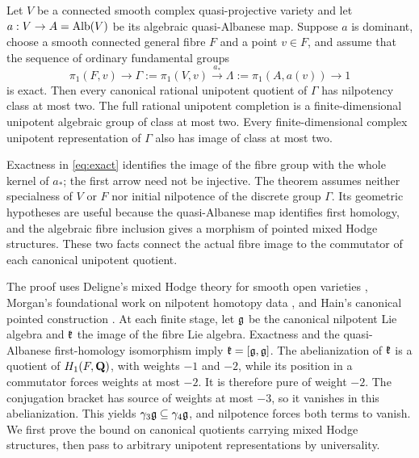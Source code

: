 \begin{theorem}\label{thm:completion}
Let $V$ be a connected smooth complex quasi-projective variety and let
$a:V\to A=\operatorname{Alb}(V)$ be its algebraic quasi-Albanese map. Suppose $a$ is
dominant, choose a smooth connected general fibre $F$ and a point
$v\in F$, and assume that the sequence of ordinary fundamental groups
\begin{equation}\label{eq:exact}
 \pi_1(F,v)\longrightarrow\Gamma:=\pi_1(V,v)
 \xrightarrow{a_*}\Lambda:=\pi_1(A,a(v))\longrightarrow1
\end{equation}
is exact. Then every canonical rational unipotent quotient of $\Gamma$
has nilpotency class at most two. The full rational unipotent completion
is a finite-dimensional unipotent algebraic group of class at most two.
Every finite-dimensional complex unipotent representation of $\Gamma$
also has image of class at most two.
\end{theorem}

Exactness in \eqref{eq:exact} identifies the image of the fibre group
with the whole kernel of $a_*$; the first arrow need not be injective.
The theorem assumes neither specialness of $V$ or $F$ nor initial
nilpotence of the discrete group $\Gamma$. Its geometric hypotheses
are useful because the quasi-Albanese map identifies first homology,
and the algebraic fibre inclusion gives a morphism of pointed mixed
Hodge structures. These two facts connect the actual fibre image to
the commutator of each canonical unipotent quotient.

The proof uses Deligne's mixed Hodge theory for smooth open varieties
\cite{Deligne1971}, Morgan's foundational work on nilpotent homotopy data
\cite{Morgan1978,Morgan1986}, and Hain's canonical pointed construction
\cite{Hain1987}. At each finite stage, let $\mathfrak g$ be the canonical
nilpotent Lie algebra and $\mathfrak k$ the image of the fibre Lie algebra.
Exactness and the quasi-Albanese first-homology isomorphism imply
$\mathfrak k=[\mathfrak g,\mathfrak g]$. The abelianization of $\mathfrak k$ is a quotient of
$H_1(F,\mathbf Q)$, with weights $-1$ and $-2$, while its position in a
commutator forces weights at most $-2$. It is therefore pure of weight
$-2$. The conjugation bracket has source of weights at most $-3$, so it
vanishes in this abelianization. This yields
$\gamma_3\mathfrak g\subseteq\gamma_4\mathfrak g$, and nilpotence forces both terms to
vanish. We first prove the bound on canonical quotients carrying mixed
Hodge structures, then pass to arbitrary unipotent representations by
universality.

